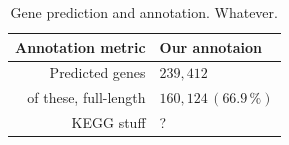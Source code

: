 \documentclass{bmcart}
\begin{document}
\begin{backmatter}
\begin{table}[h!]
\caption{Gene prediction and annotation. Whatever.}
\begin{tabular}{rl}
\hline
Annotation metric & Our annotaion\\
\hline
Predicted genes & $239,412$\\
of these, full-length & $160,124\,(66.9\,\%)$\\
KEGG stuff & ?\\
\hline
\end{tabular}
\label{tGenes}
\end{table}


%


\end{backmatter}
\newpage
\listoftodos
\end{document}
